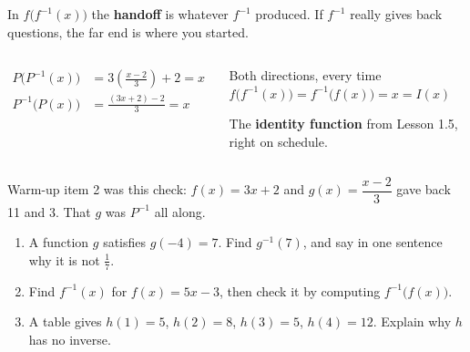 \documentclass[aspectratio=169, 11pt]{beamer}
\begin{document}
\begin{frame}[t, plain]

  In \(f\big(f^{-1}(x)\big)\) the \textbf{handoff} is whatever \(f^{-1}\)
  produced. If \(f^{-1}\) really gives back questions, the far end is where you
  started.

  \medskip
  \begin{columns}[T, onlytextwidth]
      \begin{align*}
        P\big(P^{-1}(x)\big) &= 3\!\left(\frac{x-2}{3}\right) + 2 = x \\[4pt]
        P^{-1}\big(P(x)\big) &= \frac{(3x+2) - 2}{3} = x
      \end{align*}

      \begin{block}{Both directions, every time}
        \(f\big(f^{-1}(x)\big) = f^{-1}\big(f(x)\big) = x = I(x)\)

        \smallskip
        The \textbf{identity function} from Lesson 1.5, right on schedule.
      \end{block}
  \end{columns}

  \medskip
  \begin{center}
    Warm-up item 2 was this check: \(f(x) = 3x+2\) and \(g(x) =
    \dfrac{x-2}{3}\) gave back 11 and 3. That \(g\) was \(P^{-1}\) all along.
  \end{center}
\end{frame}

\begin{frame}[t, plain]

  \begin{enumerate}\setlength{\itemsep}{10pt}
    \item A function \(g\) satisfies \(g(-4) = 7\). Find \(g^{-1}(7)\), and say
          in one sentence why it is not \(\tfrac{1}{7}\).

    \item Find \(f^{-1}(x)\) for \(f(x) = 5x - 3\), then check it by computing
          \(f^{-1}\big(f(x)\big)\).

    \item A table gives \(h(1) = 5\), \(h(2) = 8\), \(h(3) = 5\), \(h(4) = 12\).
          Explain why \(h\) has no inverse.
  \end{enumerate}
\end{frame}
\end{document}
